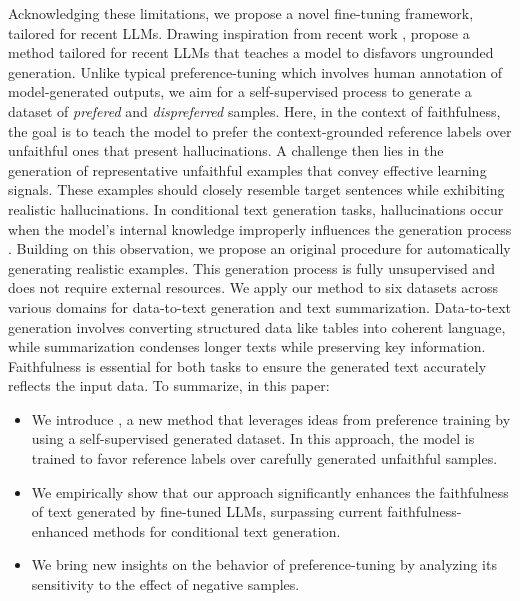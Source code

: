 Acknowledging these limitations, we propose a novel fine-tuning framework, tailored for recent LLMs. Drawing inspiration from recent work \citep{dpo}, propose a method tailored for recent LLMs that teaches a model to disfavors ungrounded generation. Unlike typical preference-tuning which involves human annotation of model-generated outputs, we aim for a self-supervised process to generate a dataset of \textit{prefered} and \emph{dispreferred} samples. Here, in the context of faithfulness, the goal is to teach the model to prefer the context-grounded reference labels over unfaithful ones that present hallucinations. A challenge then lies in the generation of representative unfaithful examples that convey effective learning signals. These examples should closely resemble target sentences while exhibiting realistic hallucinations. In conditional text generation tasks, hallucinations occur when the model's internal knowledge improperly influences the generation process \citep{faithfulness-summarization}. Building on this observation, we propose an original procedure for automatically generating realistic examples. This generation process is fully unsupervised and does not require external resources. 
We apply our method to six datasets across various domains for data-to-text generation and text summarization. Data-to-text generation \citep{lin-d2t} involves converting structured data like tables into coherent language, while summarization condenses longer texts while preserving key information. Faithfulness is essential for both tasks to ensure the generated text accurately reflects the input data. To summarize, in this paper:

\begin{itemize}[leftmargin=*]
    \item We introduce \scope, a new method that leverages ideas from preference training by using a self-supervised generated dataset. In this approach, the model is trained to favor reference labels over carefully generated unfaithful samples.
    \item We empirically show that our approach significantly enhances the faithfulness of text generated by fine-tuned LLMs, surpassing current faithfulness-enhanced methods for conditional text generation.
    \item We bring new insights on the behavior of preference-tuning by analyzing its sensitivity to the effect of negative samples.
\end{itemize}


